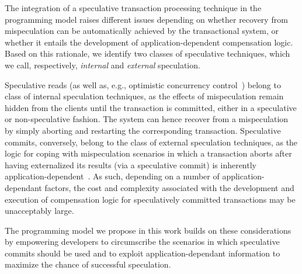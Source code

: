 The integration of a speculative transaction processing technique in the programming model raises different issues depending on whether recovery from mispeculation can be automatically achieved by the transactional system, or whether it entails the development of application-dependent compensation logic. Based on this rationale, we identify two classes of speculative techniques, which we call, respectively, \textit{internal} and \textit{external} speculation.

Speculative reads (as well as, e.g., optimistic concurrency control~\cite{berenson1995critique}) belong to class of internal speculation techniques, as the effects of mispeculation remain hidden from the clients until the transaction is committed, either in a speculative or non-speculative fashion. The system can hence recover from a mispeculation by simply aborting and restarting the corresponding transaction. Speculative commits, conversely, belong to the class of external speculation techniques, as the logic for coping with mispeculation scenarios in which a transaction aborts after having externalized its results  (via a speculative commit) is inherently application-dependent~\cite{bailis2013eventual}. As such, depending on a number of application-dependant factors, the cost and complexity associated with the development and execution of compensation logic for speculatively committed transactions may be unacceptably large.

The programming model we propose in this work builds on these considerations by empowering  developers to circumscribe the scenarios in which speculative commits should be used and to exploit application-dependant information to maximize the chance of successful speculation.

